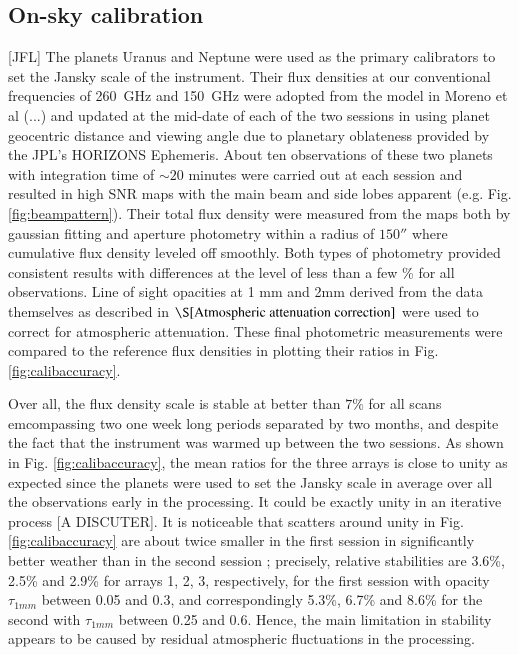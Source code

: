 \documentclass[]{aa} %
\begin{document}
\subsection{On-sky calibration}
\label{On-sky calibration}
[JFL]
The planets Uranus and Neptune  were used as the primary calibrators to set the Jansky scale of the instrument.
Their flux densities at our conventional frequencies of 260~GHz and 150~GHz were adopted from the model in Moreno et al (...)
and updated at the mid-date of each of the two sessions in using planet geocentric distance
and viewing angle due to planetary oblateness provided by the JPL's HORIZONS Ephemeris.
About ten observations of these two planets with integration time of $\sim 20$ minutes were carried out at each session  
and resulted in high SNR maps with the main beam and side lobes apparent (e.g. Fig. \ref{fig:beampattern}).
Their total flux density were measured
from the maps both by gaussian fitting and aperture photometry within a radius of  $150''$ where cumulative flux density leveled off smoothly.
Both types of photometry provided consistent results with differences at the level of less than a few \% for all observations.
Line of sight opacities at 1 mm and 2mm derived from the data themselves as described
in $\S\ref{Atmospheric attenuation correction}$ were used to correct for atmospheric attenuation.
These final photometric measurements were compared to the reference
flux densities in plotting their ratios in Fig. \ref{fig:calibaccuracy}.

Over all, the flux density scale is stable at better than $7\%$ for all scans emcompassing
two one week long periods separated by two months, and despite the fact that the instrument was warmed up between the two sessions. 
As shown in Fig. \ref{fig:calibaccuracy}, the mean ratios for the three arrays is close to unity as expected since
the planets were used to set the Jansky scale in average over all the observations early in the processing. It could be
exactly unity in an iterative process [A DISCUTER]. It is noticeable
that scatters around unity in Fig. \ref{fig:calibaccuracy}
are about twice smaller in the first session in significantly better weather than in the second session ; precisely, relative stabilities
are 3.6\%, 2.5\% and 2.9\% for arrays 1, 2, 3, respectively, for the first session with opacity $\tau_{1mm}$ between 0.05 and 0.3,
and correspondingly  5.3\%, 6.7\% and 8.6\% for the second with  $\tau_{1mm}$ between 0.25 and 0.6.
Hence, the main limitation in stability appears to be caused by residual atmospheric fluctuations in the processing. 
\end{document}
